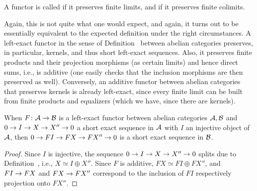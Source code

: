 \documentclass[a4paper,parskip=half,numbers=enddot, DIV=12]{scrreprt}
\begin{document}
\begin{defi}
	A functor is called  if it preserves finite limits, and  if it preserves finite colimits.
\end{defi}
\begin{rem}
	Again, this is not quite what one would expect, and again, it turns out to be essentially equivalent to the expected definition under the right circumstances. A left-exact functor in the sense of Definition~ between abelian categories preserves, in particular, kernels, and thus short left-exact sequences. Also, it preserves finite products and their projection morphisms (as certain limits) and hence direct sums, i.e., is additive (one easily checks that the inclusion morphisms are then preserved as well). Conversely, an additive functor between abelian categories that preserves kernels is already left-exact, since every finite limit can be built from finite products and equalizers (which we have, since there are kernels).
\end{rem}
\begin{prop}
	When $F\colon \Aa\morphism\Bb$ is a left-exact functor between abelian categories $\mathcal{A},\mathcal{B}$ and $0\morphism I\morphism X\morphism X''\morphism 0$ a short exact sequence in $\mathcal{A}$ with $I$ an injective object of $\mathcal{A}$, then $0\morphism FI\morphism FX\morphism FX''\morphism 0$ is a short exact sequence in $\mathcal{B}$.
\end{prop}
\begin{proof}
	Since $I$ is injective, the sequence $0\morphism I\morphism X\morphism X''\morphism 0$ splits due to Definition~, i.e., $X\simeq I\oplus X''$. Since $F$ is additive, $FX\simeq FI\oplus FX''$, and $FI\morphism FX$ and $FX\morphism FX''$ correspond to the inclusion of $FI$ respectively projection onto $FX''$.
\end{proof}

\printbibliography
\end{document}

